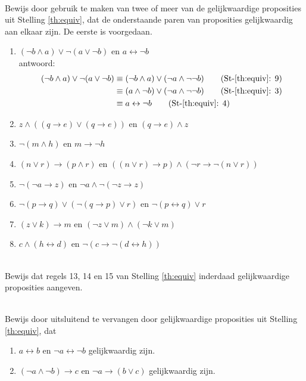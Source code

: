 \begin{exercise}\mbox{}\\
Bewijs door gebruik te maken van twee of meer van de gelijkwaardige proposities uit Stelling \ref{th:equiv}, dat de onderstaande paren van proposities gelijkwaardig aan elkaar zijn. De eerste is voorgedaan.
\begin{enumerate}[label=\textit{\alph*.}]
\item $(\neg b\land a)\lor \neg (a\lor \neg b)$ en $a\leftrightarrow \neg b$\\
antwoord:
\begin{align}
(\neg b\wedge a)\vee \neg (a\vee \neg b) &\equiv (\neg b\wedge a)\vee (\neg a \wedge \neg \neg b)  \tag{St-\ref{th:equiv}: 9} \\
&\equiv (a\wedge \neg b)\vee (\neg a \wedge \neg \neg b)  \tag{St-\ref{th:equiv}: 3} \\
&\equiv a\leftrightarrow \neg b\tag{St-\ref{th:equiv}: 4}
\end{align}
\item $z\land ((q\rightarrow e) \lor (q\rightarrow e))$ en $(q \rightarrow e) \land z$
\item $\neg (m\land h)$ en $m \rightarrow \neg h$
\item $(n \lor r)\rightarrow (p \land r)$ en $((n \lor r)\rightarrow p) \land (\neg r \rightarrow \neg (n \lor r))$
\item $\neg (\neg a \rightarrow z)$ en $\neg a \land \neg (\neg z\rightarrow z)$
\item $\neg(p\rightarrow q) \lor (\neg (q \rightarrow p) \lor r)$ en $\neg (p\leftrightarrow q) \lor r$
\item $(z\lor k)\rightarrow m$ en $(\neg z \lor m) \land (\neg k \lor m)$
\item $c \land (h\leftrightarrow d)$ en $\neg (c \rightarrow \neg (d \leftrightarrow h))$  

\end{enumerate}
\end{exercise}

\begin{exercise}\mbox{}\\
Bewijs dat regels 13, 14 en 15 van Stelling \ref{th:equiv} inderdaad gelijkwaardige proposities aangeven.
\end{exercise}

\begin{exercise}\mbox{}\\
Bewijs door uitsluitend te vervangen door gelijkwaardige proposities uit Stelling \ref{th:equiv}, dat
\begin{enumerate}[label=\textit{\alph*.}]
\item $a\leftrightarrow b$ en $\neg a \leftrightarrow \neg b$ gelijkwaardig zijn.
\item $(\neg a\land\neg b)\rightarrow c$ en $\neg a\rightarrow(b\lor c)$ gelijkwaardig zijn.
\end{enumerate}
\end{exercise}

